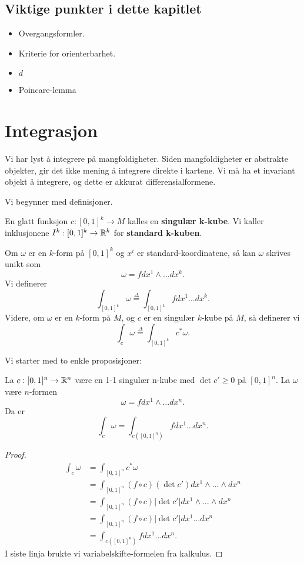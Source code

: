 \documentclass[11pt, english]{article}
\begin{document}
\subsection{Viktige punkter i dette kapitlet}
\begin{itemize}
\item Overgangsformler.
\item Kriterie for orienterbarhet.
\item $d$
\item Poincare-lemma
\end{itemize}


\section{Integrasjon}

Vi har lyst å integrere på mangfoldigheter. Siden mangfoldigheter er abstrakte objekter, gir det ikke mening å integrere direkte i kartene. Vi må ha et invariant objekt å integrere, og dette er akkurat differensialformene.

Vi begynner med definisjoner.

\begin{defi}
En glatt funksjon $c:[0,1]^k \to M$ kalles en \textbf{singulær k-kube}. Vi kaller inklusjonene $I^k:[0,1]^k \to \mathbb{R}^k$ for \textbf{standard k-kuben}. 
\end{defi}

Om $\omega$ er en $k$-form på $[0,1]^k$  og $x^i$ er standard-koordinatene, så kan $\omega$ skrives unikt som
$$
\omega = f dx^1 \wedge \ldots dx^k.
$$
Vi definerer
$$
\int_{[0,1]^k} \omega \stackrel{\Delta}{=} \int_{[0,1]^k} f dx^1 \ldots dx^k.
$$
Videre, om $\omega$ er en $k$-form på $M$, og $c$ er en singulær $k$-kube på $M$, så definerer vi
$$
\int_c \omega \stackrel{\Delta}{=} \int_{[0,1]^k} c^\ast \omega .
$$

Vi starter med to enkle proposisjoner:
\begin{prop}
La $c:[0,1]^n \to \mathbb{R}^n$ være en 1-1 singulær n-kube med $\det c' \geq 0$ på $[0,1]^n$. La $\omega$ være $n$-formen
$$
\omega = f dx^1\wedge \ldots dx^n.
$$
Da er 
$$
\int_c \omega = \int_{c([0,1]^n)} f dx^1 \ldots dx^n.
$$
\end{prop}

\begin{proof}
\begin{align*}
\int_c \omega &= \int_{[0,1]^n} c^\ast \omega \\
&= \int_{[0,1]^n} (f \circ c)(\det c') dx^1 \wedge \ldots \wedge dx^n \\
&= \int_{[0,1]^n} (f \circ c)|\det c' | dx^1 \wedge \ldots \wedge dx^n \\
&= \int_{[0,1]^n} (f \circ c) |\det c'| dx^1 \ldots dx^n \\
&= \int_{c([0,1]^n)} f dx^1 \ldots dx^n.
\end{align*}
I siste linja brukte vi variabelskifte-formelen fra kalkulus. 
\end{proof}
\end{document}
